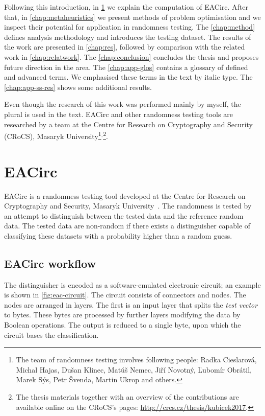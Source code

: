 \documentclass[
    digital,    %
    oneside,    %
    color,
    11pt,
    nocover,
    notable,
    nolof,
    nolot,
]{fithesis3}
\begin{document}
Following this introduction, in \cref{chap:eacirc} we explain the computation of EACirc. After that, in \cref{chap:metaheuristics} we present methods of problem optimisation and we inspect their potential for application in randomness testing. The \cref{chap:method} defines analysis methodology and introduces the testing dataset. The results of the work are presented in \cref{chap:res}, followed by comparison with the related work in \cref{chap:relatwork}. The \cref{chap:conclusion} concludes the thesis and proposes future direction in the area. The \cref{chap:app-glos} contains a glossary of defined and advanced terms. We emphasised these terms in the text by italic type. The \cref{chap:app-ss-res} shows some additional results.

Even though the research of this work was performed mainly by myself, the plural is used in the text. EACirc and other randomness testing tools are researched by a team at the Centre for Research on Cryptography and Security (CRoCS), Masaryk University\footnote{The team of randomness testing involves following people: Radka Cieslarová, Michal Hajas, Dušan Klinec, Matúš Nemec, Jiří Novotný, Ľubomír Obrátil, Marek Sýs, Petr Švenda, Martin Ukrop and others.}$^{,}$\footnote{The thesis materials together with an overview of the contributions are available online on the CRoCS's pages: \url{http://crcs.cz/thesis/kubicek2017}.}.


\chapter{EACirc}
\label{chap:eacirc}

EACirc is a randomness testing tool developed at the Centre for Research on Cryptography and Security, Masaryk University~\cite{EACirc}. The randomness is tested by an attempt to distinguish between the tested data and the reference random data. The tested data are non-random if there exists a distinguisher capable of classifying these datasets with a probability higher than a random guess.

\section{EACirc workflow}
\label{sec:eac-comp}

The distinguisher is encoded as a software-emulated electronic circuit; an example is shown in \cref{fig:eac-circuit}. The circuit consists of connectors and nodes. The nodes are arranged in layers. The first is an input layer that splits the \textit{test vector} to bytes. These bytes are processed by further layers modifying the data by Boolean operations. The output is reduced to a single byte, upon which the circuit bases the classification.
\end{document}
